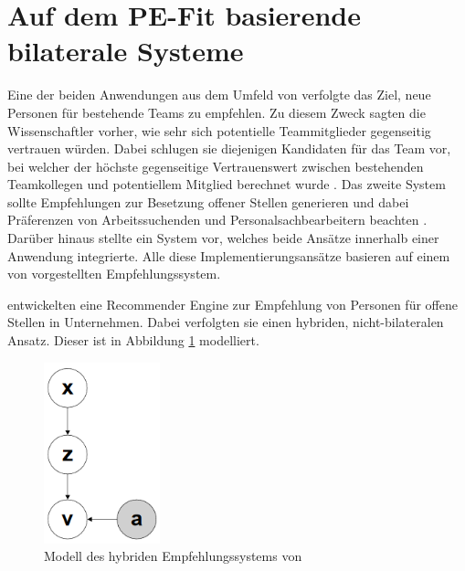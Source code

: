 \section{Auf dem PE-Fit basierende bilaterale Systeme}
\label{ch:verwandteArbeiten:aufDemPEFitBasierendeBilateraleSysteme}
Eine der beiden Anwendungen aus dem Umfeld von \textcite[S. 1ff.]{malinowski:2006} verfolgte das Ziel, neue Personen für bestehende Teams zu empfehlen. Zu diesem Zweck sagten die Wissenschaftler vorher, wie sehr sich potentielle Teammitglieder gegenseitig vertrauen würden. Dabei schlugen sie diejenigen Kandidaten für das Team vor, bei welcher der höchste gegenseitige Vertrauenswert zwischen bestehenden Teamkollegen und potentiellem Mitglied berechnet wurde \cite[S. 5ff.]{keim:2005}\cite[S. 1ff.]{malinowski:2006}. Das zweite System sollte Empfehlungen zur Besetzung offener Stellen generieren und dabei Präferenzen von Arbeitssuchenden und Personalsachbearbeitern beachten \cite[S. 1ff.]{malinowski:2005}. Darüber hinaus stellte \textcite[S. 5ff.]{keim:2007} ein System vor, welches beide Ansätze innerhalb einer Anwendung integrierte. Alle diese Implementierungsansätze basieren auf einem von \textcite[S. 6ff.]{faerber:2003} vorgestellten Empfehlungssystem.

\textcite[S. 4ff.]{faerber:2003} entwickelten eine Recommender Engine zur Empfehlung von Personen für offene Stellen in Unternehmen. Dabei verfolgten sie einen hybriden, nicht-bilateralen Ansatz. Dieser ist in Abbildung \ref{fig:verwandteArbeiten:abb1} modelliert.

\begin{figure}[h]
	\centering
	\includegraphics[width=0.3\textwidth]{gfx/faerber.png}
	\caption{Modell des hybriden Empfehlungssystems von \textcite[S. 8]{faerber:2003}}
	\label{fig:verwandteArbeiten:abb1}
\end{figure}

